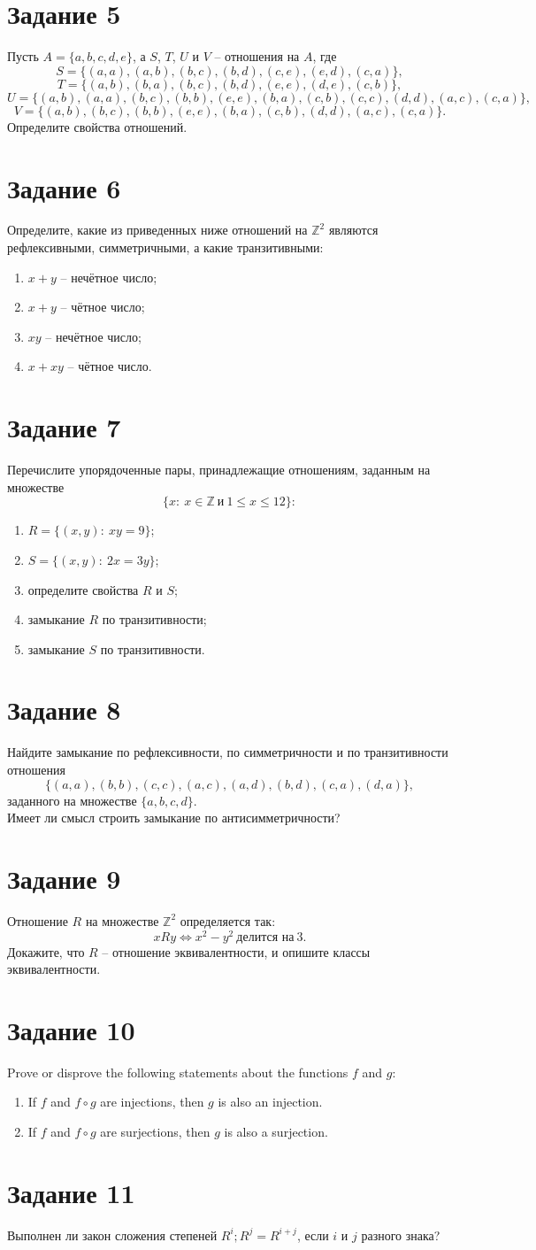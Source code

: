 \documentclass[a4paper,12pt,oneside]{article}
\newcommand{\Z}{\mathbb{Z}}
\newcommand{\Task}[1]{\section*{\normalfont\bfseries Задание #1}}
\begin{document}
\Task{5}
Пусть $A=\{a,b,c,d,e\}$, а $S$, $T$, $U$ и $V$ – отношения на $A$, где
\[
S=\{(a,a),(a,b),(b,c),(b,d),(c,e),(e,d),(c,a)\},
\]
\[
T=\{(a,b),(b,a),(b,c),(b,d),(e,e),(d,e),(c,b)\},
\]
\[
U=\{(a,b),(a,a),(b,c),(b,b),(e,e),(b,a),(c,b),(c,c),(d,d),(a,c),(c,a)\},
\]
\[
V=\{(a,b),(b,c),(b,b),(e,e),(b,a),(c,b),(d,d),(a,c),(c,a)\}.
\]
Определите свойства отношений.

\Task{6}
Определите, какие из приведенных ниже отношений на $\Z^2$ являются рефлексивными, симметричными, а какие транзитивными:
\begin{enumerate}[label=\arabic*)]
\item $x+y$ – нечётное число;
\item $x+y$ – чётное число;
\item $xy$ – нечётное число;
\item $x+xy$ – чётное число.
\end{enumerate}

\Task{7}
Перечислите упорядоченные пары, принадлежащие отношениям, заданным на множестве
\[
\{x:\ x\in \Z\ \text{и}\ 1\le x\le 12\}:
\]
\begin{enumerate}[label=\arabic*)]
\item $R=\{(x,y):\ xy=9\}$;
\item $S=\{(x,y):\ 2x=3y\}$;
\item определите свойства $R$ и $S$;
\item замыкание $R$ по транзитивности;
\item замыкание $S$ по транзитивности.
\end{enumerate}

\Task{8}
Найдите замыкание по рефлексивности, по симметричности и по транзитивности отношения
\[
\{(a,a),(b,b),(c,c),(a,c),(a,d),(b,d),(c,a),(d,a)\},
\]
заданного на множестве $\{a,b,c,d\}$.\\
Имеет ли смысл строить замыкание по антисимметричности?

\Task{9}
Отношение $R$ на множестве $\Z^2$ определяется так:
\[
xRy \iff x^2-y^2\ \text{делится на}\ 3.
\]
Докажите, что $R$ – отношение эквивалентности, и опишите классы эквивалентности.

\Task{10}
Prove or disprove the following statements about the functions $f$ and $g$:
\begin{enumerate}[label=\alph*)]
\item If $f$ and $f\circ g$ are injections, then $g$ is also an injection.
\item If $f$ and $f\circ g$ are surjections, then $g$ is also a surjection.
\end{enumerate}

\Task{11}
Выполнен ли закон сложения степеней $R^i;R^j=R^{i+j}$, если $i$ и $j$ разного знака?
\end{document}
